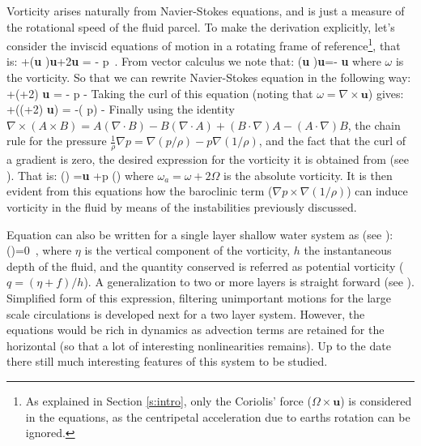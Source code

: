 Vorticity arises naturally from Navier-Stokes equations, and is just
a measure of the rotational speed of the fluid parcel. To make the
derivation explicitly, let's consider the inviscid equations of motion in
a rotating frame of reference\footnote{
    As explained in Section
    \ref{s:intro}, only the Coriolis' force ($\Omega \times \textbf{u}$) is
    considered in the equations, as the centripetal acceleration due to
    earths rotation can be ignored.
}, that is:
\beq
{}+(\textbf{u} \cdot \nabla)\textbf{u}+2\Omega \times \textbf{u}
= - \nabla p
\,.
From vector calculus we note that:
\beq
(\textbf{u} \cdot \nabla)\textbf{u}=- \textbf{u} \times \omega
{}
where $\omega$ is the vorticity. So that we can rewrite Navier-Stokes equation in the following way:
\beq
{}+(\omega+2\Omega) \times \textbf{u} = - \nabla p -
Taking the curl of this equation (noting that $\omega = \nabla \times
\textbf{u}$) gives:
\beq
{}+\nabla \times ((\omega+2\Omega) \times \textbf{u}) = -\nabla \times\left( \nabla p\right) -\nabla \times {}
Finally using the identity $\nabla \times (A \times B) = A (\nabla
\cdot B)-B (\nabla \cdot A)+(B \cdot \nabla)A-(A \cdot \nabla)B$, the
chain rule for the pressure $\frac{1}{\rho} \nabla p = \nabla (p/\rho)-p
\nabla (1/\rho)$, and the fact that the curl of a gradient is zero, the
desired expression for the vorticity it is obtained from
 (see ). That is:
\beq
{}\left(\right)
= \textbf{u}
  +\nabla p \times \nabla \left(\right)
where $\omega_a=\omega+2\Omega$ is the absolute vorticity. It is then
evident from this equations how the baroclinic term ($\nabla p \times
\nabla (1/\rho)$) can induce vorticity in the fluid by means of the
instabilities previously discussed.

Equation  can also be written for a single layer shallow water system as (see ):
\beq
{}\left(\right)=0
\,,
where $\eta$ is the vertical component of the vorticity, $h$ the instantaneous depth of the fluid, and the quantity conserved is referred as potential vorticity ($q=(\eta + f)/h$). A generalization to two or  more layers is straight forward (see ).  Simplified form of this
expression, filtering unimportant motions for the large scale circulations
is developed next for a two layer system. However, the equations would be rich in dynamics as advection terms are retained for the horizontal
(so that a lot of interesting nonlinearities remains). Up to the date
there still much interesting features of this system to be studied.




